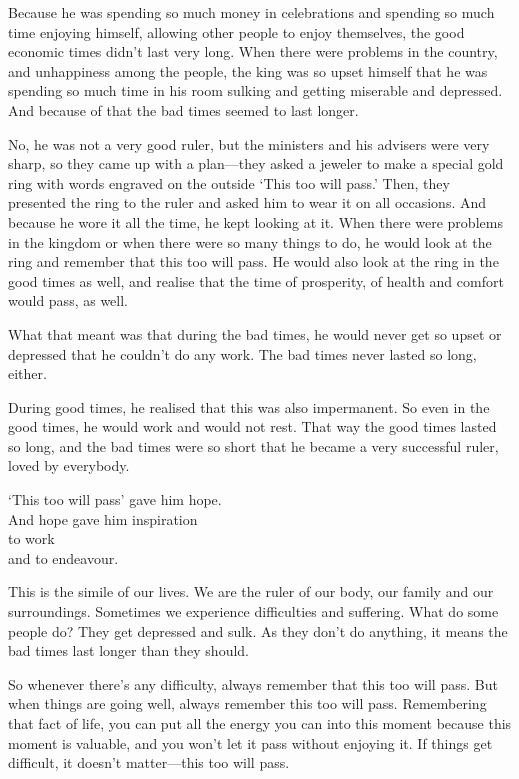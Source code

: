 \documentclass[12pt, openany]{book}
\newenvironment{aphorism}%
{%
\begin{center}\begin{itshape}
}%
{\end{itshape}\end{center}
}%
\begin{document}
Because he was spending so much money in celebrations and spending so much time enjoying himself, allowing other people to enjoy themselves, the good economic times didn’t last very long. When there were problems in the country, and unhappiness among the people, the king was so upset himself that he was spending so much time in his room sulking and getting miserable and depressed. And because of that the bad times seemed to last longer. 

No, he was not a very good ruler, but the ministers and his advisers were very sharp, so they came up with a plan—they asked a jeweler to make a special gold ring with words engraved on the outside ‘This too will pass.’ Then, they presented the ring to the ruler and asked him to wear it on all occasions. And because he wore it all the time, he kept looking at it. When there were problems in the kingdom or when there were so many things to do, he would look at the ring and remember that this too will pass. He would also look at the ring in the good times as well, and realise that the time of prosperity, of health and comfort would pass, as well. 

What that meant was that during the bad times, he would never get so upset or depressed that he couldn’t do any work. The bad times never lasted so long, either. 

During good times, he realised that this was also impermanent. So even in the good times, he would work and would not rest. That way the good times lasted so long, and the bad times were so short that he became a very successful ruler, loved by everybody. 

\begin{aphorism}
‘This too will pass’ gave him hope.\\  
And hope gave him inspiration\\ 
to work\\  
and to endeavour.
\end{aphorism}

This is the simile of our lives. We are the ruler of our body, our family and our surroundings. Sometimes we experience difficulties and suffering. What do some people do? They get depressed and sulk. As they don’t do anything, it means the bad times last longer than they should. 

So whenever there’s any difficulty, always remember that this too will pass. But when things are going well, always remember this too will pass. Remembering that fact of life, you can put all the energy you can into this moment because this moment is valuable, and you won’t let it pass without enjoying it. If things get difficult, it doesn’t matter—this too will pass. 
\end{document}
